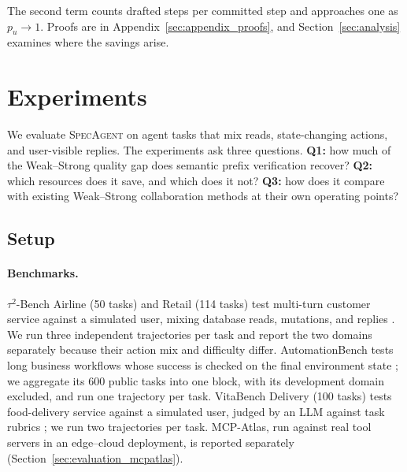 \documentclass[11pt, copyright, logo, secondlogo]{template/lark}
\newcommand{\SpecAgent}{\textsc{SpecAgent}\xspace}
\begin{document}
The second term counts drafted steps per committed step and approaches one as
$p_u\to1$. Proofs are in Appendix~\ref{sec:appendix_proofs}, and
Section~\ref{sec:analysis} examines where the savings arise.
\section{Experiments}
\label{sec:evaluation}

We evaluate \SpecAgent{} on agent tasks that mix reads, state-changing
actions, and user-visible replies. The experiments ask three questions.
\textbf{Q1:} how much of the Weak--Strong quality gap does semantic prefix
verification recover? \textbf{Q2:} which resources does it save, and which
does it not? \textbf{Q3:} how does it compare with existing Weak--Strong
collaboration methods at their own operating points?

\subsection{Setup}
\label{sec:evaluation_shared}

\paragraph{Benchmarks.}
$\tau^2$-Bench Airline (50 tasks) and Retail (114 tasks) test multi-turn
customer service against a simulated user, mixing database reads, mutations,
and replies \citep{barres2025tau2}. We run three independent trajectories per
task and report the two domains separately because their action mix and
difficulty differ. AutomationBench tests long business workflows whose
success is checked on the final environment state
\citep{shepard2026automationbench}; we aggregate its 600 public tasks
into one block, with its development domain excluded, and run one trajectory
per task. VitaBench Delivery
(100 tasks) tests food-delivery service against a simulated user, judged by an
LLM against task rubrics \citep{he2025vitabench}; we run two trajectories per
task. MCP-Atlas, run against
real tool servers in an edge--cloud deployment, is reported separately
(Section~\ref{sec:evaluation_mcpatlas}).
\end{document}
